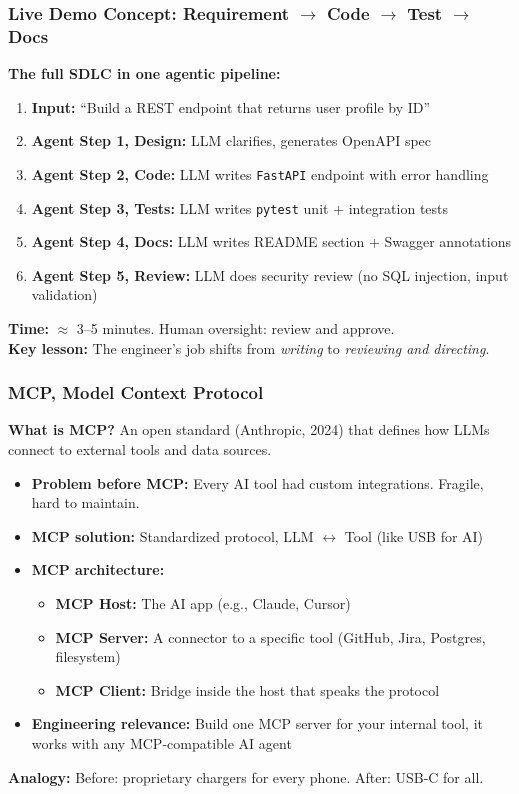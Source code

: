 \begin{frame}[fragile]\frametitle{Live Demo Concept: Requirement $\rightarrow$ Code $\rightarrow$ Test $\rightarrow$ Docs}
\textbf{The full SDLC in one agentic pipeline:}
\begin{enumerate}
\item \textbf{Input:} ``Build a REST endpoint that returns user profile by ID''
\item \textbf{Agent Step 1, Design:} LLM clarifies, generates OpenAPI spec
\item \textbf{Agent Step 2, Code:} LLM writes \texttt{FastAPI} endpoint with error handling
\item \textbf{Agent Step 3, Tests:} LLM writes \texttt{pytest} unit + integration tests
\item \textbf{Agent Step 4, Docs:} LLM writes README section + Swagger annotations
\item \textbf{Agent Step 5, Review:} LLM does security review (no SQL injection, input validation)
\end{enumerate}
\textbf{Time:} $\approx$ 3--5 minutes. Human oversight: review and approve.\\
\textbf{Key lesson:} The engineer's job shifts from \textit{writing} to \textit{reviewing and directing}.
\end{frame}

\begin{frame}[fragile]\frametitle{MCP, Model Context Protocol}
\textbf{What is MCP?} An open standard (Anthropic, 2024) that defines how LLMs connect to external tools and data sources.

\begin{itemize}
\item \textbf{Problem before MCP:} Every AI tool had custom integrations. Fragile, hard to maintain.
\item \textbf{MCP solution:} Standardized protocol, LLM $\leftrightarrow$ Tool (like USB for AI)
\item \textbf{MCP architecture:}
  \begin{itemize}
  \item \textbf{MCP Host:} The AI app (e.g., Claude, Cursor)
  \item \textbf{MCP Server:} A connector to a specific tool (GitHub, Jira, Postgres, filesystem)
  \item \textbf{MCP Client:} Bridge inside the host that speaks the protocol
  \end{itemize}
\item \textbf{Engineering relevance:} Build one MCP server for your internal tool, it works with any MCP-compatible AI agent
\end{itemize}

\textbf{Analogy:} Before: proprietary chargers for every phone. After: USB-C for all.
\end{frame}


